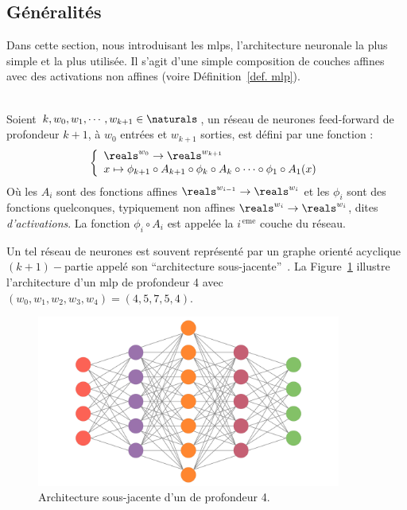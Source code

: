 \subsection{Généralités}

Dans cette section, nous introduisant les \glspl{mlp},
l'architecture neuronale la plus simple et la plus utilisée.
Il s'agit d'une simple composition de couches affines avec des activations non affines 
(voire Définition~\ref{def. mlp}).


\begin{definition}\ \\
    \label{def. mlp}
    Soient \(k, w_0, w_1, \cdots, w_{k+1}\in\naturals\), 
    un réseau de neurones feed-forward de profondeur \(k+1\), à \(w_0\) entrées et \(w_{k+1}\) sorties, 
    est défini par une fonction :
    \begin{equation}
        \label{eq. mlp}
        \left\{
        \begin{array}{l}
            \reals^{w_0} \to \reals^{w_{k+1}}\\
            x\mapsto
            \phi_{k+1} \circ A_{k+1} \circ \phi_k \circ A_k \circ \cdots \circ \phi_1 \circ A_1(x)
        \end{array}
        \right.
    \end{equation}
    Où les \(A_i\) sont des fonctions affines \(\reals^{w_{i-1}}\to\reals^{w_i}\) 
    et les \(\phi_i\) sont des fonctions quelconques, typiquement non affines
    \(\reals^{w_i}\to\reals^{w_i}\), dites \emph{d'activations}.
    La fonction \(\phi_i\circ A_i\) est appelée la \(i^{\, \mathrm{eme}}\) couche du réseau.
\end{definition}

Un tel réseau de neurones est souvent représenté par 
un graphe orienté acyclique \((k+1)-\)partie  appelé son ``architecture sous-jacente''~\parencite{Kearns_Vazirani_1994}. 
La Figure~\ref{fig. mlp} illustre l'architecture d'un \gls{mlp} de profondeur 4
avec \((w_0, w_1, w_2, w_3, w_4) = (4, 5, 7, 5, 4)\).


\begin{figure}[hbt]
    \begin{center}
        \includegraphics[width=10cm]{assets/images/mlp.png}
    \end{center}
    \caption{Architecture sous-jacente d'un  de profondeur 4.}
    \label{fig. mlp}
\end{figure}

